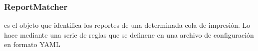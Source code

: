 \documentclass[a4paper,12pt,spanish]{sphinxmanual}
\begin{document}
\begin{fulllineitems}
\begin{quote}
\begin{description}
\end{description}\end{quote}

\end{fulllineitems}



\subsubsection{ReportMatcher}
\label{\detokenize{openerm.ReportMatcher:module-openerm.ReportMatcher}}\label{\detokenize{openerm.ReportMatcher:reportmatcher}}\label{\detokenize{openerm.ReportMatcher::doc}}
 es el objeto que identifica los reportes de una
determinada cola de impresión. Lo hace mediante una serie de reglas que se
definene en una archivo de configuración en formato YAML
\end{document}

